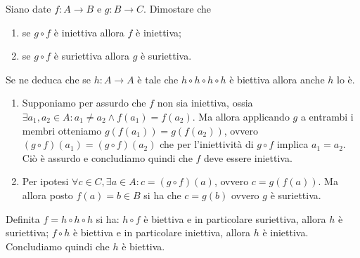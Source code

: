 \begin{es}
  Siano date $ f \colon A \to B $ e $ g \colon B \to C $. Dimostare che
  \begin{enumerate}
  \item se $ g \circ f $ è iniettiva allora $ f $ è iniettiva;
  \item se $ g \circ f $ è suriettiva allora $ g $ è suriettiva.
  \end{enumerate}
  Se ne deduca che se $ h \colon A \to A $ è tale che $ h \circ h \circ h \circ h $ è biettiva allora anche $ h $ lo è.
\end{es}
\begin{enumerate}
\item Supponiamo per assurdo che $ f $ non sia iniettiva, ossia $ \exists a_1, a_2 \in A : a_1 \neq a_2 \wedge f(a_1) = f(a_2) $. Ma allora applicando $ g $ a entrambi i membri otteniamo $ g(f(a_1)) = g(f(a_2)) $, ovvero $ (g \circ f)(a_1) = (g \circ f)(a_2) $ che per l'iniettività di $ g \circ f $ implica $ a_1 = a_2 $. Ciò è assurdo e concludiamo quindi che $ f $ deve essere iniettiva.
\item Per ipotesi $ \forall c \in C, \exists a \in A : c = (g \circ f)(a) $, ovvero $ c = g(f(a)) $. Ma allora posto $ f(a) = b \in B $ si ha che $ c = g(b) $ ovvero $ g $ è suriettiva.
\end{enumerate}
Definita $ f = h \circ h \circ h $ si ha: $ h \circ f $ è biettiva e in particolare suriettiva, allora $ h $ è suriettiva; $ f \circ h $ è biettiva e in particolare iniettiva, allora $ h $ è iniettiva. Concludiamo quindi che $ h $ è biettiva.


